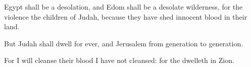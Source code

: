 {Egypt shall be a
desolation, and
Edom shall be a
desolate
wilderness, for the
violence
{} the
children of
Judah, because they have
shed
innocent
blood in their
land.

But
Judah shall
dwell for
ever, and
Jerusalem from
generation to
generation.

For I will
cleanse their
blood
{} I have not
cleansed: for the
{}
dwelleth in
Zion.


\par }